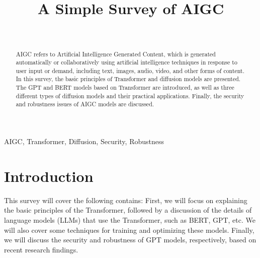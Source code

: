 \documentclass[conference]{IEEEtran}
\begin{document}
\title{A Simple Survey of AIGC\\
}

\author{\\
}

\maketitle

\begin{abstract}
AIGC refers to Artificial Intelligence Generated Content, 
which is generated automatically or collaboratively using 
artificial intelligence techniques in response to user input 
or demand, including text, images, audio, video, and other forms 
of content. In this survey, the basic principles of Transformer 
and diffusion models are presented. The GPT and BERT models 
based on Transformer are introduced, as well as three different 
types of diffusion models and their practical applications. 
Finally, the security and robustness issues of AIGC models are 
discussed.
\end{abstract}

\begin{IEEEkeywords}
AIGC, Transformer, Diffusion, Security, Robustness
\end{IEEEkeywords}

\section{Introduction}
This survey will cover the following contains: First, 
we will focus on explaining the basic principles of the Transformer\cite{b1}, 
followed by a discussion of the details of language models (LLMs) 
that use the Transformer, such as BERT\cite{b2}, GPT\cite{b3, b4, b5, b6}, etc. 
We will also cover some techniques for training and optimizing 
these models. 
Finally, we will discuss the security and 
robustness of GPT models, respectively, 
based on recent research findings.
\end{document}
